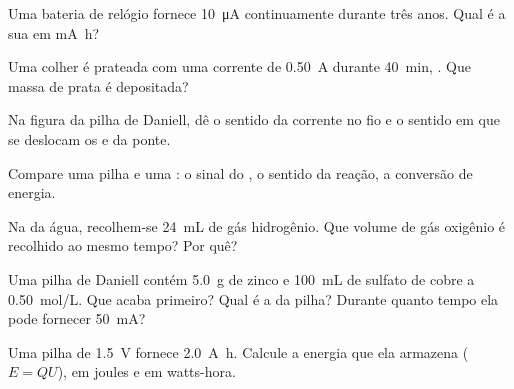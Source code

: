 \begin{exercise}[$\star\star$]\label{exo:g12:cells-and-electrolysis:7}
Uma bateria de relógio fornece \qty{10}{\micro A} continuamente durante
três anos. Qual é a sua  em \si{mA.h}?
\end{exercise}

\begin{exercise}[$\star\star$]\label{exo:g12:cells-and-electrolysis:8}
Uma colher é prateada com uma corrente de \qty{0.50}{A} durante
\qty{40}{min}, . Que massa de prata é depositada?
\end{exercise}

\begin{exercise}[$\star\star$]\label{exo:g12:cells-and-electrolysis:9}
Na figura da pilha de Daniell, dê o sentido da corrente no fio e o
sentido em que se deslocam os   e  da ponte.
\end{exercise}

\begin{exercise}[$\star\star$]\label{exo:g12:cells-and-electrolysis:10}
Compare uma pilha e uma : o sinal do , o sentido da
reação, a conversão de energia.
\end{exercise}

\begin{exercise}[$\star\star$]\label{exo:g12:cells-and-electrolysis:11}
Na  da água, recolhem-se \qty{24}{mL} de gás hidrogênio. Que
volume de gás oxigênio é recolhido ao mesmo tempo? Por quê?
\end{exercise}

\begin{exercise}[$\star\star\star$]\label{exo:g12:cells-and-electrolysis:12}
Uma pilha de Daniell contém \qty{5.0}{g} de zinco e \qty{100}{mL} de
sulfato de cobre a \qty{0.50}{mol/L}. Que  acaba primeiro? Qual
é a  da pilha? Durante quanto tempo ela pode fornecer
\qty{50}{mA}?
\end{exercise}

\begin{exercise}[$\star\star\star$]\label{exo:g12:cells-and-electrolysis:13}
Uma pilha de \qty{1.5}{V} fornece \qty{2.0}{A.h}. Calcule a energia que
ela armazena ($E = Q U$), em joules e em watts-hora.
\end{exercise}

